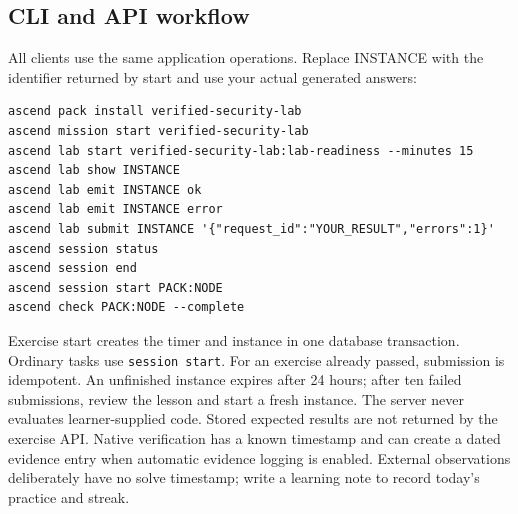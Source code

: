 \subsection{CLI and API workflow}
All clients use the same application operations. Replace INSTANCE with the identifier
returned by start and use your actual generated answers:
\begin{verbatim}
ascend pack install verified-security-lab
ascend mission start verified-security-lab
ascend lab start verified-security-lab:lab-readiness --minutes 15
ascend lab show INSTANCE
ascend lab emit INSTANCE ok
ascend lab emit INSTANCE error
ascend lab submit INSTANCE '{"request_id":"YOUR_RESULT","errors":1}'
ascend session status
ascend session end
ascend session start PACK:NODE
ascend check PACK:NODE --complete
\end{verbatim}
Exercise start creates the timer and instance in one database transaction. Ordinary
tasks use \texttt{session start}. For an exercise already passed, submission
is idempotent. An unfinished instance expires after 24 hours; after ten failed
submissions, review the lesson and start a fresh instance. The server never evaluates
learner-supplied code. Stored expected results are not returned by the exercise API.
Native verification has a known timestamp and can create a dated evidence entry when
automatic evidence logging is enabled. External observations deliberately have no
solve timestamp; write a learning note to record today's practice and streak.
